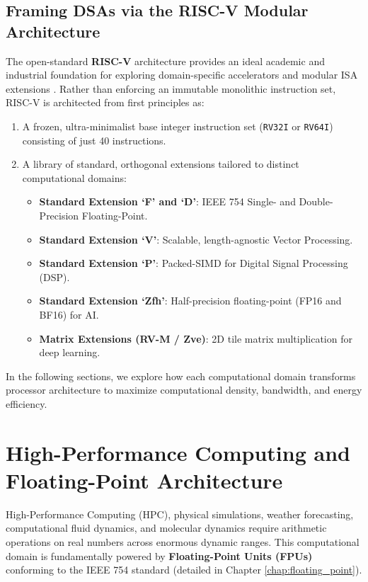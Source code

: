 \subsection{Framing DSAs via the RISC-V Modular Architecture}
The open-standard \textbf{RISC-V} architecture provides an ideal academic and industrial foundation for exploring domain-specific accelerators and modular ISA extensions \cite{asanovic2014instruction, riscv-spec}. Rather than enforcing an immutable monolithic instruction set, RISC-V is architected from first principles as:
\begin{enumerate}
    \item A frozen, ultra-minimalist base integer instruction set (\texttt{RV32I} or \texttt{RV64I}) consisting of just 40 instructions.
    \item A library of standard, orthogonal extensions tailored to distinct computational domains:
    \begin{itemize}
        \item \textbf{Standard Extension `F' and `D'}: IEEE 754 Single- and Double-Precision Floating-Point.
        \item \textbf{Standard Extension `V'}: Scalable, length-agnostic Vector Processing.
        \item \textbf{Standard Extension `P'}: Packed-SIMD for Digital Signal Processing (DSP).
        \item \textbf{Standard Extension `Zfh'}: Half-precision floating-point (FP16 and BF16) for AI.
        \item \textbf{Matrix Extensions (RV-M / Zve)}: 2D tile matrix multiplication for deep learning.
    \end{itemize}
\end{enumerate}
In the following sections, we explore how each computational domain transforms processor architecture to maximize computational density, bandwidth, and energy efficiency.


\section{High-Performance Computing and Floating-Point Architecture}\label{sec:hpc_floating_point}

High-Performance Computing (HPC), physical simulations, weather forecasting, computational fluid dynamics, and molecular dynamics require arithmetic operations on real numbers across enormous dynamic ranges. This computational domain is fundamentally powered by \textbf{Floating-Point Units (FPUs)} conforming to the IEEE 754 standard (detailed in Chapter \ref{chap:floating_point}).

